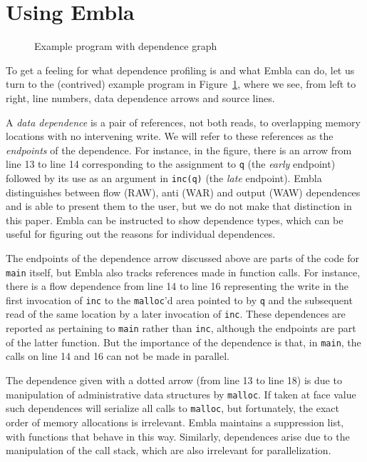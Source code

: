 \documentclass[times, 10pt,twocolumn]{article}
\begin{document}


\section{Using Embla}

\begin{figure} 
\small

\caption{Example program with dependence graph} \label{ffirstex}
\end{figure}

To get a feeling for what dependence profiling is and what Embla can do, 
let us turn to the (contrived) example program in Figure~\ref{ffirstex},
where we see, from left to right, line numbers, data dependence 
arrows and source lines. 

A {\em data dependence} is a pair
of references, not both reads, to overlapping memory
locations with no intervening write. We will refer to these
references as the {\em endpoints} of the dependence.
For instance, in the figure, 
there is an arrow from line 13 to line 14 corresponding to
the assignment to {\tt q} (the {\em early} endpoint) followed by its use 
as an argument in {\tt inc(q)} (the {\em late} endpoint). Embla
distinguishes between flow (RAW), anti (WAR) and output (WAW) 
dependences and is able to present them to the user, but we do not make
that distinction in this paper. Embla 
can be instructed to show dependence types, which can be
useful for figuring out the reasons for individual dependences.

The endpoints of the dependence arrow discussed above are parts of
the code for {\tt main} itself, but Embla also tracks references made 
in function calls. For
instance, there is a flow dependence from line 14 to line 16
representing the write in the first invocation of {\tt inc} to the 
{\tt malloc}'d area pointed to by {\tt q} and the subsequent read 
of the same location by a later invocation of {\tt inc}. 
These dependences 
are reported as pertaining to {\tt main} rather than {\tt inc},
although the endpoints are part of the latter function. 
But the importance of the dependence is that, in {\tt main}, the calls
on line 14 and 16 can not be made in parallel.

The dependence given with a dotted arrow 
(from line 13 to line 18) is due to manipulation of administrative 
data structures by {\tt malloc}. If taken at face value such dependences will
serialize all calls to {\tt malloc}, but fortunately, the exact order
of memory allocations is irrelevant. Embla maintains a suppression list,
with functions that behave 
in this way.  Similarly, dependences arise due to the
manipulation of the call stack, which are also irrelevant for parallelization.
\end{document}
